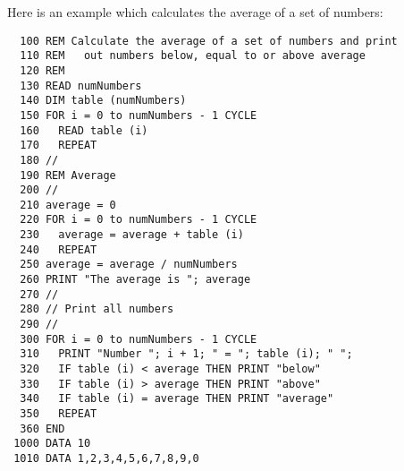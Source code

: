Here is an example which calculates the average of a set of numbers:
\begin{verbatim}
  100 REM Calculate the average of a set of numbers and print
  110 REM	out numbers below, equal to or above average
  120 REM
  130 READ numNumbers
  140 DIM table (numNumbers)
  150 FOR i = 0 to numNumbers - 1 CYCLE
  160   READ table (i)
  170   REPEAT
  180 //
  190 REM Average
  200 //
  210 average = 0
  220 FOR i = 0 to numNumbers - 1 CYCLE
  230   average = average + table (i)
  240   REPEAT
  250 average = average / numNumbers
  260 PRINT "The average is "; average
  270 //
  280 // Print all numbers
  290 //
  300 FOR i = 0 to numNumbers - 1 CYCLE
  310   PRINT "Number "; i + 1; " = "; table (i); " ";
  320   IF table (i) < average THEN PRINT "below"
  330   IF table (i) > average THEN PRINT "above"
  340   IF table (i) = average THEN PRINT "average"
  350   REPEAT
  360 END
 1000 DATA 10
 1010 DATA 1,2,3,4,5,6,7,8,9,0
\end{verbatim}
